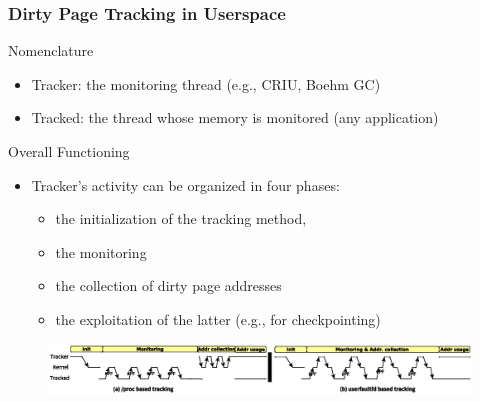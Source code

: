 \documentclass[xcolor=table,bigger,unknownkeysallowed]{beamer}
\begin{document}
        \begin{frame}
			\thispagestyle{empty}
			\frametitle{Dirty Page Tracking in Userspace} 
				\begin{block}{Nomenclature}
					\begin{itemize}
						\item Tracker: the monitoring thread (e.g., CRIU, Boehm GC)
						\item Tracked: the thread whose memory is monitored (any application)
					\end{itemize}
				\end{block}		
				
				\begin{block}{Overall Functioning}
					\begin{itemize}
						\item Tracker's activity can be organized in four phases: 
						\begin{itemize}
							\item the initialization of the tracking method,
							\item the monitoring
							\item the collection of dirty page addresses
							\item the exploitation of the latter (e.g., for checkpointing)
						\end{itemize}
					\end{itemize}
				\end{block}	

				\begin{figure}
			   \centering
				   \includegraphics[width=1\columnwidth]{fig/solutions1}
			   \end{figure}
			\end{frame}
\end{document}
